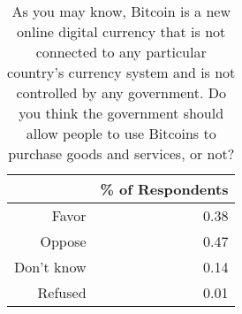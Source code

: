 \begin{table}[ht]
\centering
\begin{tabular}{rr}
  \hline
 & \% of Respondents \\ 
  \hline
Favor & 0.38 \\ 
  Oppose & 0.47 \\ 
  Don't know & 0.14 \\ 
  Refused & 0.01 \\ 
   \hline
\end{tabular}
\caption{As you may know, Bitcoin is a new online digital currency that is not connected to any particular country's currency system and is not controlled by any government. Do you think the government should allow people to use Bitcoins to purchase goods and services, or not?} 
\end{table}
